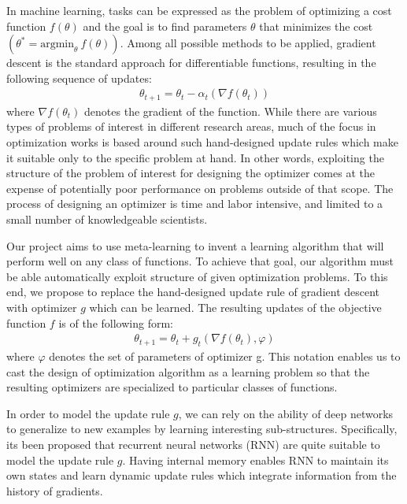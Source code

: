 \documentclass[a4paper, 11pt]{article}
\begin{document}
In machine learning, tasks can be expressed as the problem of optimizing a cost function $f(\theta)$ and the goal is to find parameters $\theta$ that minimizes the cost $(\theta^*=\text{argmin}_{\theta} \ f(\theta))$. Among all possible methods to be applied, gradient descent is the standard approach for differentiable functions, resulting in the following sequence of updates:
\begin{eqnarray}
\theta_{t+1}=\theta_{t}-\alpha_t(\nabla f(\theta_{t}))
\end{eqnarray}
\noindent
where $\nabla f(\theta_{t})$ denotes the gradient of the function. While there are various types of problems of interest in different research areas, much of the focus in optimization works is based around such hand-designed update rules which make it suitable only to the specific problem at hand. In other words, exploiting the structure of the problem of interest for designing the optimizer comes at the expense of potentially poor performance on problems outside of that scope. The process of designing an optimizer is time and labor intensive, and limited to a small number of knowledgeable scientists.

Our project aims to use meta-learning to invent a learning algorithm that will perform well on any class of functions. To achieve that goal, our algorithm must be able automatically exploit structure of given optimization problems. To this end, we propose to replace the hand-designed update rule of gradient descent with optimizer $g$ which can be learned. The resulting updates of the objective function $f$ is of the following form:
\begin{eqnarray}
\theta_{t+1}=\theta_{t}+g_t(\nabla f(\theta_{t}),\varphi)
\end{eqnarray}
\noindent
where $\varphi$ denotes the set of parameters of optimizer g. This notation enables us to cast the design of optimization algorithm as a learning problem so that the resulting optimizers are specialized to particular classes of functions\cite{andrychowicz2016learning}. 

In order to model the update rule $g$, we can rely on the ability of deep networks to generalize to new examples by learning interesting sub-structures. Specifically, it\textsc{}s been proposed that recurrent neural networks (RNN) are quite suitable to model the update rule $g$. Having internal memory enables RNN to maintain its own states and learn dynamic update rules which integrate information from the history of gradients.
\end{document}
